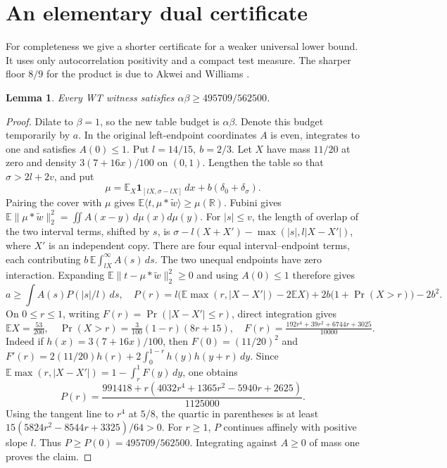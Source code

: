 \documentclass[11pt]{article}
\newtheorem{lemma}[theorem]{Lemma}
\newcommand{\R}{\mathbb R}
\newcommand{\E}{\mathbb E}
\newcommand{\ind}{\mathbf1}
\newcommand{\norm}[1]{\lVert #1\rVert}
\begin{document}
\section*{An elementary dual certificate}
For completeness we give a shorter certificate for a weaker universal lower bound. It uses only autocorrelation positivity and a compact test measure. The sharper floor \(8/9\) for the product is due to Akwei and Williams \cite{aw}.

\begin{lemma}
Every WT witness satisfies \(\alpha\beta\ge495709/562500\).
\end{lemma}
\begin{proof}
Dilate to \(\beta=1\), so the new table budget is \(\alpha\beta\). Denote this budget temporarily by \(a\). In the original left-endpoint coordinates \(A\) is even, integrates to one and satisfies \(A(0)\le1\). Put \(l=14/15,\ b=2/3\). Let \(X\) have mass \(11/20\) at zero and density \(3(7+16x)/100\) on \((0,1)\). Lengthen the table so that \(\sigma>2l+2v\), and put
\[
 \mu=\E_X\ind_{[lX,\sigma-lX]}\,dx+b(\delta_0+\delta_\sigma).
\]
Pairing the cover with \(\mu\) gives
\(\E\langle t,\mu*\widetilde w\rangle\ge\mu(\R)\).
Fubini gives
\(\E\norm{\mu*\widetilde w}_2^2=\iint A(x-y)\,d\mu(x)d\mu(y)\).
For \(|s|\le v\), the length of overlap of the two interval terms, shifted by \(s\), is
\(\sigma-l(X+X')-\max(|s|,l|X-X'|)\), where \(X'\) is an independent copy. There are four equal interval--endpoint terms, each contributing \(b\,\E\int_{lX}^\infty A(s)\,ds\). The two unequal endpoints have zero interaction. Expanding \(\E\norm{t-\mu*\widetilde w}_2^2\ge0\) and using \(A(0)\le1\) therefore gives
\[
 a\ge\int A(s)P(|s|/l)\,ds,\quad
 P(r)=l\bigl(\E\max(r,|X-X'|)-2\E X\bigr)
             +2b\bigl(1+\Pr(X>r)\bigr)-2b^2 .
\]
On \(0\le r\le1\), writing \(F(r)=\Pr(|X-X'|\le r)\), direct integration gives
\[
 \E X=\tfrac{53}{200},\quad
 \Pr(X>r)=\tfrac3{100}(1-r)(8r+15),\quad
 F(r)=\tfrac{192r^4+39r^2+6744r+3025}{10000}.
\]
Indeed if \(h(x)=3(7+16x)/100\), then \(F(0)=(11/20)^2\) and
\(F'(r)=2(11/20)h(r)+2\int_0^{1-r}h(y)h(y+r)\,dy\).
Since \(\E\max(r,|X-X'|)=1-\int_r^1F(y)\,dy\), one obtains
\[
 P(r)=\frac{991418+r(4032r^4+1365r^2-5940r+2625)}{1125000}.
\]
Using the tangent line to \(r^4\) at \(5/8\), the quartic in parentheses is at least \(15(5824r^2-8544r+3325)/64>0\). For \(r\ge1\), \(P\) continues affinely with positive slope \(l\). Thus \(P\ge P(0)=495709/562500\). Integrating against \(A\ge0\) of mass one proves the claim.
\end{proof}
\end{document}
